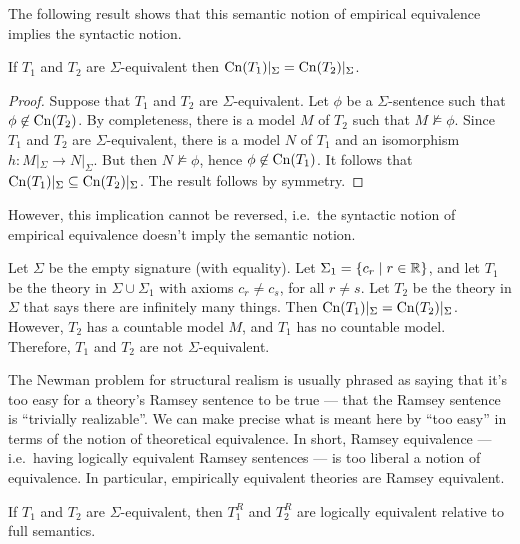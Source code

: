 The following result shows that this semantic notion of empirical
equivalence implies the syntactic notion.

\begin{prop} If $T_1$ and $T_2$ are $\Sigma$-equivalent then
  $\mathrm{Cn}(T_1)|_\Sigma=\mathrm{Cn}(T_2)|_\Sigma$. \end{prop}

\begin{proof} Suppose that $T_1$ and $T_2$ are $\Sigma$-equivalent.
  Let $\phi$ be a $\Sigma$-sentence such that $\phi\not\in\mathrm{Cn}(T_2)$.
  By completeness, there is a model $M$ of $T_2$ such that
  $M\not\vDash\phi$.  Since $T_1$ and $T_2$ are $\Sigma$-equivalent,
  there is a model $N$ of $T_1$ and an isomorphism
  $h:M|_\Sigma\to N|_\Sigma$.  But then $N\not\vDash\phi$, hence
  $\phi\not\in \mathrm{Cn}(T_1)$.  It follows that
  $\mathrm{Cn}(T_1)|_\Sigma\subseteq \mathrm{Cn}(T_2)|_{\Sigma}$.  The result follows
  by symmetry.
\end{proof}

However, this implication cannot be reversed, i.e.\ the syntactic
notion of empirical equivalence doesn't imply the semantic notion.

\begin{example} Let $\Sigma$ be the empty signature (with equality).
  Let $\Sigma _1 = \{ c_r\mid r\in \mathbb R \}$, and let $T _1$ be the
  theory in $\Sigma\cup\Sigma _1$ with axioms $c_r\neq c_s$, for all
  $r\neq s$.  Let $T_2$ be the theory in $\Sigma$ that says there are
  infinitely many things.  Then $\mathrm{Cn}(T_1)|_\Sigma=\mathrm{Cn}(T_2)|_\Sigma$.
  However, $T_2$ has a countable model $M$, and $T_1$ has no countable
  model.  Therefore, $T_1$ and $T_2$ are not $\Sigma$-equivalent.
\end{example}

The Newman problem for structural realism is usually phrased as saying
that it's too easy for a theory's Ramsey sentence to be true --- that
the Ramsey sentence is ``trivially realizable''.  We can make precise
what is meant here by ``too easy'' in terms of the notion of
theoretical equivalence.  In short, Ramsey equivalence --- i.e.\
having logically equivalent Ramsey sentences --- is too liberal a
notion of equivalence.  In particular, empirically equivalent theories
are Ramsey equivalent.

\begin{prop}[Dewar] If $T_1$ and $T_2$ are $\Sigma$-equivalent, then
  $T_1^R$ and $T_2^R$ are logically equivalent relative to full
  semantics. \end{prop}


